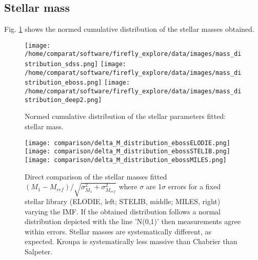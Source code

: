 \documentclass[onecolumn]{aa}
\begin{document}
\subsection{Stellar mass}

Fig. \ref{fig:distributions:MS} shows the normed cumulative distribution of the stellar masses obtained.

\begin{figure}
\begin{center}
\caption{\label{fig:distributions:MS} 
Normed cumulative distribution of the stellar parameters fitted: stellar mass.}  
\texttt{[image: /home/comparat/software/firefly\_explore/data/images/mass\_distribution\_sdss.png]}
\texttt{[image: /home/comparat/software/firefly\_explore/data/images/mass\_distribution\_eboss.png]}
\texttt{[image: /home/comparat/software/firefly\_explore/data/images/mass\_distribution\_deep2.png]}
\end{center}
\end{figure}


\begin{figure}
\begin{center}
\caption{\label{fig:comparison:imfs:MS} 
Direct comparison of the stellar masses fitted $(M_1-M_{ref})/\sqrt{\sigma^2_{M_1}+\sigma^2_{M_{ref}}}$ where $\sigma$ are 1$\sigma$ errors for a fixed stellar library (ELODIE, left; STELIB, middle; MILES, right) varying the IMF. If the obtained distribution follows a normal distribution depicted with the line 'N(0,1)' then measurements agree within errors. 
Stellar masses are systematically different, as expected. Kroupa is systematically less massive than Chabrier than Salpeter.}
\texttt{[image: comparison/delta\_M\_distribution\_ebossELODIE.png]}
\texttt{[image: comparison/delta\_M\_distribution\_ebossSTELIB.png]}
\texttt{[image: comparison/delta\_M\_distribution\_ebossMILES.png]}
\end{center}
\end{figure}
\end{document}
